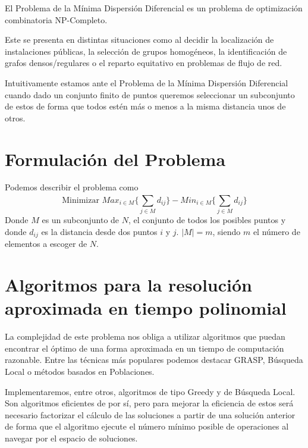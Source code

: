 
El Problema de la Mínima Dispersión Diferencial es un problema de optimización combinatoria NP-Completo.\cite{Seminario2MH}

Este se presenta en distintas situaciones como al decidir la localización de instalaciones públicas,
la selección de grupos homogéneos, la identificación de grafos densos/regulares o el reparto equitativo en problemas de
flujo de red.\cite{DUARTE201546}

Intuitivamente estamos ante el Problema de la Mínima Dispersión Diferencial cuando dado un conjunto finito de puntos queremos
seleccionar un subconjunto de estos de forma que todos estén más o menos a la misma distancia unos de otros.

\section{Formulación del Problema}

Podemos describir el problema como
$$\textrm{Minimizar } Max_{i\in M}\{\sum_{j\in M}^{}d_{ij}\}-Min_{i\in M}\{\sum_{j\in M}^{}d_{ij}\} $$
Donde $M$ es un subconjunto de $N$, el conjunto de todos los posibles puntos y donde $d_{ij}$ es la distancia desde dos puntos $i$ y $j$.
$|M| = m$, siendo $m$ el número de elementos a escoger de $N$.

\section{Algoritmos para la resolución aproximada en tiempo polinomial}

La complejidad de este problema nos obliga a utilizar algoritmos que puedan encontrar el óptimo de una forma aproximada en un tiempo de computación razonable.
Entre las técnicas más populares podemos destacar GRASP, Búsqueda Local o métodos basados en Poblaciones.\cite{MDP2010}

Implementaremos, entre otros, algoritmos de tipo Greedy y de Búsqueda Local. Son algoritmos eficientes de por sí, pero para
mejorar la eficiencia de estos será necesario factorizar el cálculo de las soluciones a partir de una solución anterior de forma
que el algoritmo ejecute el número mínimo posible de operaciones al navegar por el espacio de soluciones.